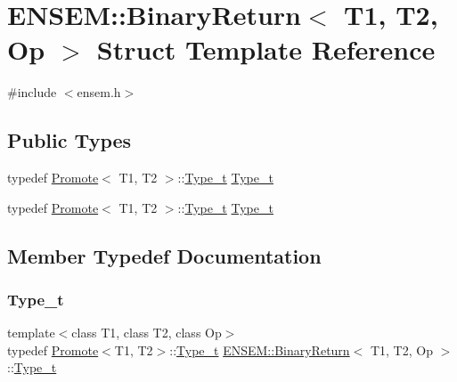 \hypertarget{structENSEM_1_1BinaryReturn}{}\section{E\+N\+S\+EM\+:\+:Binary\+Return$<$ T1, T2, Op $>$ Struct Template Reference}
\label{structENSEM_1_1BinaryReturn}


{\ttfamily \#include $<$ensem.\+h$>$}

\subsection*{Public Types}
\begin{DoxyCompactItemize}
\item 
typedef \mbox{\hyperlink{structENSEM_1_1Promote}{Promote}}$<$ T1, T2 $>$\+::\mbox{\hyperlink{structENSEM_1_1BinaryReturn_a8e4e01e2c9cd832cfe1a41a67305ac06}{Type\+\_\+t}} \mbox{\hyperlink{structENSEM_1_1BinaryReturn_a8e4e01e2c9cd832cfe1a41a67305ac06}{Type\+\_\+t}}
\item 
typedef \mbox{\hyperlink{structENSEM_1_1Promote}{Promote}}$<$ T1, T2 $>$\+::\mbox{\hyperlink{structENSEM_1_1BinaryReturn_a8e4e01e2c9cd832cfe1a41a67305ac06}{Type\+\_\+t}} \mbox{\hyperlink{structENSEM_1_1BinaryReturn_a8e4e01e2c9cd832cfe1a41a67305ac06}{Type\+\_\+t}}
\end{DoxyCompactItemize}


\subsection{Member Typedef Documentation}
\mbox{\label{structENSEM_1_1BinaryReturn_a8e4e01e2c9cd832cfe1a41a67305ac06}} 
\subsubsection{\texorpdfstring{Type\_t}{Type\_t}\hspace{0.1cm}{\footnotesize\ttfamily [1/2]}}
{\footnotesize\ttfamily template$<$class T1, class T2, class Op$>$ \\
typedef \mbox{\hyperlink{structENSEM_1_1Promote}{Promote}}$<$T1, T2$>$\+::\mbox{\hyperlink{structENSEM_1_1BinaryReturn_a8e4e01e2c9cd832cfe1a41a67305ac06}{Type\+\_\+t}} \mbox{\hyperlink{structENSEM_1_1BinaryReturn}{E\+N\+S\+E\+M\+::\+Binary\+Return}}$<$ T1, T2, Op $>$\+::\mbox{\hyperlink{structENSEM_1_1BinaryReturn_a8e4e01e2c9cd832cfe1a41a67305ac06}{Type\+\_\+t}}}

